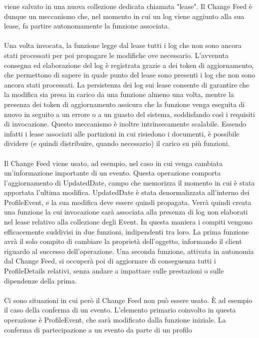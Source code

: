 viene salvato in una nuova collezione dedicata chiamata "lease".
Il Change Feed è dunque un meccanismo che,
nel momento in cui un log viene aggiunto alla sua lease,
fa partire autonomamente la funzione associata.\\
\\
Una volta invocata,
la funzione legge dal lease tutti i log che non sono ancora stati processati
per poi propagare le modifiche ove necessario.
L'avvenuta consegna ed elaborazione del log è registrata grazie a dei token di aggiornamento,
che permettono di sapere in quale punto del lease sono presenti i log che non sono ancora stati processati.
La persistenza dei log sui lease consente di garantire
che la modifica sia presa in carico da una funzione almeno una volta,
mentre la presenza dei token di aggiornamento assicura
che la funzione venga eseguita di nuovo in seguito a un errore o a un guasto del sistema,
soddisfando così i requisiti di invocazione.
Questo meccanismo è inoltre intrinsecamente scalabile.
Essendo infatti i lease associati alle partizioni in cui risiedono i documenti,
è possibile dividere (e quindi distribuire, quando necessario) il carico su più funzioni.\\
\\
Il Change Feed viene usato, ad esempio,
nel caso in cui venga cambiata un'informazione importante di un evento.
Questa operazione comporta l'aggiornamento di UpdatedDate,
campo che memorizza il momento in cui è stata apportata l'ultima modifica.
UpdatedDate è stata denormalizzata all'interno dei ProfileEvent,
e la sua modifica deve essere quindi propagata.
Verrà quindi creata una funzione la cui invocazione sarà associata
alla presenza di log non elaborati nel lease relativo alla collezione degli Event.
In questa maniera i compiti vengono efficacemente suddivisi in due funzioni,
indipendenti tra loro.
La prima funzione avrà il solo compito di cambiare la proprietà dell'oggetto,
informando il client riguardo al successo dell'operazione.
Una seconda funzione, attivata in autonomia dal Change Feed,
si occuperà poi di aggiornare di conseguenza tutti i ProfileDetails relativi,
senza andare a impattare sulle prestazioni o sulle dipendenze della prima.\\
\\
Ci sono situazioni in cui però il Change Feed non può essere usato.
È ad esempio il caso della conferma di un evento.
L'elemento primario coinvolto in questa operazione è ProfileEvent,
che sarà modificato dalla funzione iniziale.
La conferma di partecipazione a un evento da parte di un profilo
